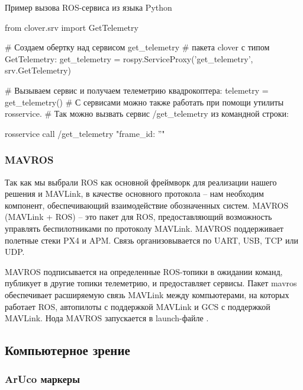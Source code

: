 \begin{Program}[H]
	\caption{Пример вызова ROS-сервиса из языка Python} \label{lst:4}
\begin{MyCode}
	from clover.srv import GetTelemetry
	
	# Создаем обертку над сервисом get_telemetry
	# пакета clover с типом GetTelemetry:
	get_telemetry = rospy.ServiceProxy('get_telemetry',
	  srv.GetTelemetry)
	
	# Вызываем сервис и получаем телеметрию квадрокоптера:
	telemetry = get_telemetry()
	# С сервисами можно также работать при помощи утилиты rosservice.
	# Так можно вызвать сервис /get_telemetry из командной строки:
	
	rosservice call /get_telemetry "{frame_id: ''}"
\end{MyCode}
\end{Program}

\subsubsection{MAVROS}
Так как мы выбрали ROS как основной фреймворк для реализации нашего решения и MAVLink, в качестве основного протокола -- нам необходим компонент, обеспечивающий взаимодействие обозначенных систем.
MAVROS (MAVLink + ROS) -- это пакет для ROS, предоставляющий возможность управлять беспилотниками по протоколу MAVLink. MAVROS поддерживает полетные стеки PX4 и APM. Связь организовывается по UART, USB, TCP или UDP.

MAVROS подписывается на определенные ROS-топики в ожидании команд, публикует в другие топики телеметрию, и предоставляет сервисы.
Пакет mavros обеспечивает расширяемую связь MAVLink между компьютерами, на которых работает ROS, автопилоты с поддержкой MAVLink и GCS с поддержкой MAVLink. Нода MAVROS запускается в launch-файле \cite{clover}.


\subsection{Компьютерное зрение}

\subsubsection{ArUco маркеры}

